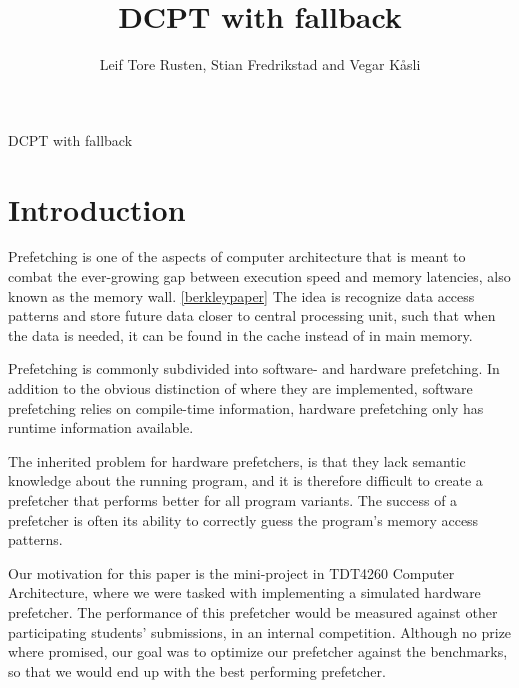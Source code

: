 \documentclass[12pt,journal,compsoc]{IEEEtran}
\begin{document}
\title{DCPT with fallback}
\author{Leif Tore Rusten,
        Stian Fredrikstad and
        Vegar K\aa sli}

%
{DCPT with fallback}


\maketitle
\IEEEdisplaynotcompsoctitleabstractindextext
\IEEEpeerreviewmaketitle

\section{Introduction}
Prefetching is one of the aspects of computer architecture that is meant to
combat the ever-growing gap between execution speed and memory latencies, also
known as the memory wall. \ref{berkleypaper} The idea is recognize data access
patterns and store future data closer to central processing unit, such that when
the data is needed, it can be found in the cache instead of in main memory.

Prefetching is commonly subdivided into software- and hardware prefetching.
In addition to the obvious distinction of where they are implemented,
software prefetching relies on compile-time information, hardware
prefetching only has runtime information available.

The inherited problem for hardware prefetchers, is that they lack semantic
knowledge about the running program, and it is therefore difficult to create a
prefetcher that performs better for all program variants. The success of a
prefetcher is often its ability to correctly guess the program's memory
access patterns. 

Our motivation for this paper is the mini-project in TDT4260 Computer
Architecture, where we were tasked with implementing a simulated hardware
prefetcher.  The performance of this prefetcher would be measured against other
participating students' submissions, in an internal competition. Although no
prize where promised, our goal was to optimize our prefetcher against the
benchmarks, so that we would end up with the best performing prefetcher.
\end{document}
